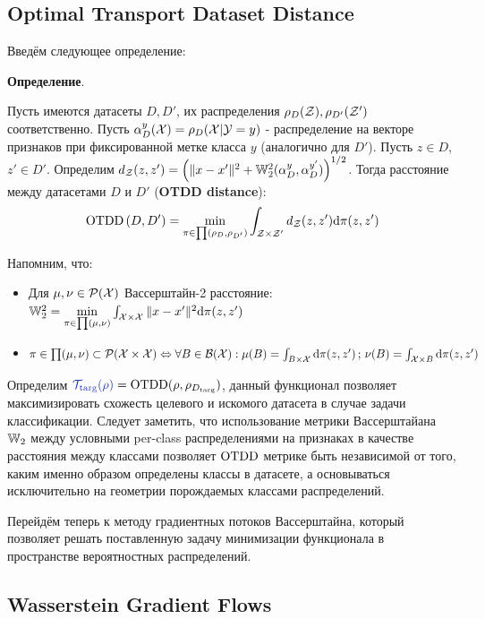\subsection{Optimal Transport Dataset Distance}

Введём следующее определение: 

\textbf{Определение}.

 Пусть имеются датасеты $D, D'$, их распределения $\rho_D(\mathcal{Z}), \rho_{D'}(\mathcal{Z}')$ соответственно. Пусть $\alpha_D^y(\mathcal{X}) = \rho_D( \mathcal{X} | \mathcal{Y} = y)$ - распределение на векторе признаков при фиксированной метке класса $y$ (аналогично для $D'$). Пусть $z \in D$, $z' \in D'$. Определим $d_{\mathcal{Z}}(z, z') = \left( \Vert x - x' \Vert^2 + \mathbb{W}_2^2(\alpha_D^y, \alpha_D^{y'}) \right)^{1/2}$. Тогда расстояние между датасетами $D$ и $D'$ (\textbf{OTDD distance}): 
\begin{gather*}
    \text{OTDD}\left(D, D'\right) = \min\limits_{\pi \in \prod\left(\rho_D, \rho_{D'}\right)} \int_{\mathcal{Z} \times \mathcal{Z}'} d_{\mathcal{Z}}(z, z') \text{d} \pi(z, z')
\end{gather*}

Напомним, что: 

\begin{itemize}
    \item Для $\mu, \nu \in \mathcal{P}(\mathcal{X})$ Вассерштайн-2 расстояние: $\mathbb{W}_2^2 = \min\limits_{\pi \in \prod(\mu, \nu)} \int_{\mathcal{X} \times \mathcal{X}} \Vert x - x' \Vert^2 \text{d} \pi(z, z')$
    \item $\pi \in \prod(\mu, \nu) \subset \mathcal{P}(\mathcal{X} \times \mathcal{X}) \Leftrightarrow \forall B \in \mathcal{B}(\mathcal{X}): \mu(B) =  \int_{B \times \mathcal{X}} \text{d} \pi(z, z') \, ; \, \nu(B) = \int_{\mathcal{X} \times B} \text{d} \pi(z, z')$
\end{itemize}

Определим $\twilight{\cT_{\targ}(\rho)} = \otdd(\rho, \rho_{D_{\targ}})$, данный функционал позволяет максимизировать схожесть целевого и искомого датасета в случае задачи классификации. Следует заметить, что использование метрики Вассерштайана $\mathbb{W}_2$ между условными per-class распределениями на признаках в качестве расстояния между классами позволяет $\text{OTDD}$ метрике быть независимой от того, каким именно образом определены классы в датасете, а основываться исключительно на геометрии порождаемых классами распределений.

Перейдём теперь к методу градиентных потоков Вассерштайна, который позволяет решать поставленную задачу минимизации функционала в пространстве вероятностных распределений.

\subsection{Wasserstein Gradient Flows}

